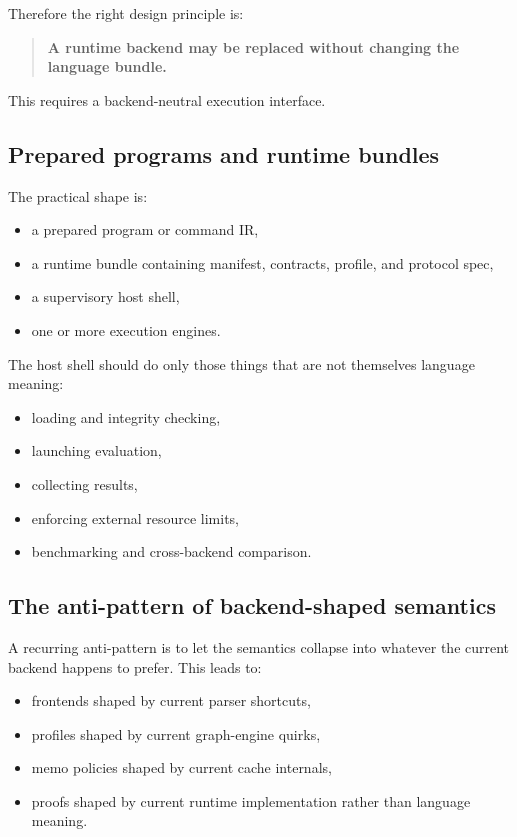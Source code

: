 \documentclass[11pt]{article}
\begin{document}
Therefore the right design principle is:
\begin{quote}
\textbf{A runtime backend may be replaced without changing the language bundle.}
\end{quote}

This requires a backend-neutral execution interface.

\subsection{Prepared programs and runtime bundles}

The practical shape is:
\begin{itemize}[leftmargin=2em]
  \item a prepared program or command IR,
  \item a runtime bundle containing manifest, contracts, profile, and protocol spec,
  \item a supervisory host shell,
  \item one or more execution engines.
\end{itemize}

The host shell should do only those things that are not themselves language meaning:
\begin{itemize}[leftmargin=2em]
  \item loading and integrity checking,
  \item launching evaluation,
  \item collecting results,
  \item enforcing external resource limits,
  \item benchmarking and cross-backend comparison.
\end{itemize}

\subsection{The anti-pattern of backend-shaped semantics}

A recurring anti-pattern is to let the semantics collapse into whatever the current backend happens to prefer. This leads to:
\begin{itemize}[leftmargin=2em]
  \item frontends shaped by current parser shortcuts,
  \item profiles shaped by current graph-engine quirks,
  \item memo policies shaped by current cache internals,
  \item proofs shaped by current runtime implementation rather than language meaning.
\end{itemize}
\end{document}
